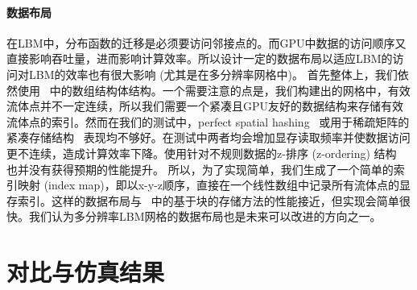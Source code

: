 \paragraph{数据布局}
在LBM中，分布函数的迁移是必须要访问邻接点的。而GPU中数据的访问顺序又直接影响吞吐量，进而影响计算效率。所以设计一定的数据布局以适应LBM的访问对LBM的效率也有很大影响 (尤其是在多分辨率网格中)。
首先整体上，我们依然使用~\cite{Chen-2021} 中的数组结构体结构。一个需要注意的点是，我们构建出的网格中，有效流体点并不一定连续，所以我们需要一个紧凑且GPU友好的数据结构来存储有效流体点的索引。然而在我们的测试中，perfect spatial hashing~\cite{Lefebvre-2006} 或用于稀疏矩阵的紧凑存储结构~\cite{Greathouse-2014} 表现均不够好。在测试中两者均会增加显存读取频率并使数据访问更不连续，造成计算效率下降。使用针对不规则数据的z-排序 (z-ordering) 结构~\cite{Chen-2021} 也并没有获得预期的性能提升。
所以，为了实现简单，我们生成了一个简单的索引映射 (index map)，即以x-y-z顺序，直接在一个线性数组中记录所有流体点的显存索引。这样的数据布局与~\cite{Chen-2021} 中的基于块的存储方法的性能接近，但实现会简单很快。我们认为多分辨率LBM网格的数据布局也是未来可以改进的方向之一。

\section{对比与仿真结果}


